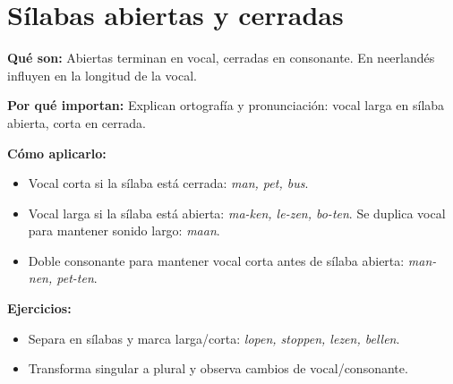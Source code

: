 \section{Sílabas abiertas y cerradas}
\textbf{Qué son:} Abiertas terminan en vocal, cerradas en consonante. En neerlandés influyen en la longitud de la vocal.

\textbf{Por qué importan:} Explican ortografía y pronunciación: vocal larga en sílaba abierta, corta en cerrada.

\textbf{Cómo aplicarlo:}
\begin{itemize}[leftmargin=*]
  \item Vocal corta si la sílaba está cerrada: \textit{man, pet, bus}.
  \item Vocal larga si la sílaba está abierta: \textit{ma-ken, le-zen, bo-ten}. Se duplica vocal para mantener sonido largo: \textit{maan}.
  \item Doble consonante para mantener vocal corta antes de sílaba abierta: \textit{man-nen, pet-ten}.
\end{itemize}

\textbf{Ejercicios:}
\begin{itemize}[leftmargin=*]
  \item Separa en sílabas y marca larga/corta: \textit{lopen, stoppen, lezen, bellen}.
  \item Transforma singular a plural y observa cambios de vocal/consonante.
\end{itemize}
